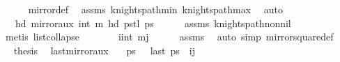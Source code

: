 \begin{isabellebody}
\ \ \ \ \isamarkupfalse%
\ mirror{}{\isacharunderscore}{\kern0pt}def\ \isamarkupfalse%
\ assms\ knights{\isacharunderscore}{\kern0pt}path{\isacharunderscore}{\kern0pt}min{}\ knights{\isacharunderscore}{\kern0pt}path{\isacharunderscore}{\kern0pt}max{}\ \isamarkupfalse%
\ auto\isanewline
\ \ \isamarkupfalse%
\ \isamarkupfalse%
\ {\isachardoublequoteopen}{\isachardot}{\kern0pt}{\isachardot}{\kern0pt}{\isachardot}{\kern0pt}\ {\isacharequal}{\kern0pt}\ hd\ {\isacharparenleft}{\kern0pt}mirror{}{\isacharunderscore}{\kern0pt}aux\ {\isacharparenleft}{\kern0pt}int\ m{\isacharplus}{\kern0pt}{}{\isacharparenright}{\kern0pt}\ {\isacharparenleft}{\kern0pt}{\isacharparenleft}{\kern0pt}hd\ ps{\isacharparenright}{\kern0pt}{\isacharhash}{\kern0pt}{\isacharparenleft}{\kern0pt}tl\ ps{\isacharparenright}{\kern0pt}{\isacharparenright}{\kern0pt}{\isacharparenright}{\kern0pt}{\isachardoublequoteclose}\isanewline
\ \ \ \ \isamarkupfalse%
\ assms\ knights{\isacharunderscore}{\kern0pt}path{\isacharunderscore}{\kern0pt}non{\isacharunderscore}{\kern0pt}nil\ \isamarkupfalse%
\ {\isacharparenleft}{\kern0pt}metis\ list{\isachardot}{\kern0pt}collapse{\isacharparenright}{\kern0pt}\isanewline
\ \ \isamarkupfalse%
\ \isamarkupfalse%
\ {\isachardoublequoteopen}{\isachardot}{\kern0pt}{\isachardot}{\kern0pt}{\isachardot}{\kern0pt}\ {\isacharequal}{\kern0pt}\ {\isacharparenleft}{\kern0pt}i{\isacharcomma}{\kern0pt}int\ m{\isacharplus}{\kern0pt}{}{\isacharminus}{\kern0pt}j{\isacharparenright}{\kern0pt}{\isachardoublequoteclose}\isanewline
\ \ \ \ \isamarkupfalse%
\ assms\ \isamarkupfalse%
\ {\isacharparenleft}{\kern0pt}auto\ simp{\isacharcolon}{\kern0pt}\ mirror{}{\isacharunderscore}{\kern0pt}square{\isacharunderscore}{\kern0pt}def{\isacharparenright}{\kern0pt}\isanewline
\ \ \isamarkupfalse%
\ \isamarkupfalse%
\ {\isacharquery}{\kern0pt}thesis\ \isacommand{{\isachardot}{\kern0pt}}\isamarkupfalse%
\isanewline
{}\isamarkupfalse%
%
\endisatagproof
{\isafoldproof}%
%
\isadelimproof
\isanewline
%
\endisadelimproof
\isanewline
{}\isamarkupfalse%
\ last{\isacharunderscore}{\kern0pt}mirror{}{\isacharunderscore}{\kern0pt}aux{\isacharcolon}{\kern0pt}\isanewline
\ \ \ {\isachardoublequoteopen}ps\ {\isasymnoteq}\ {\isacharbrackleft}{\kern0pt}{\isacharbrackright}{\kern0pt}{\isachardoublequoteclose}\ {\isachardoublequoteopen}last\ ps\ {\isacharequal}{\kern0pt}\ {\isacharparenleft}{\kern0pt}i{\isacharcomma}{\kern0pt}j{\isacharparenright}{\kern0pt}{\isachardoublequoteclose}\isanewline

\end{isabellebody}
